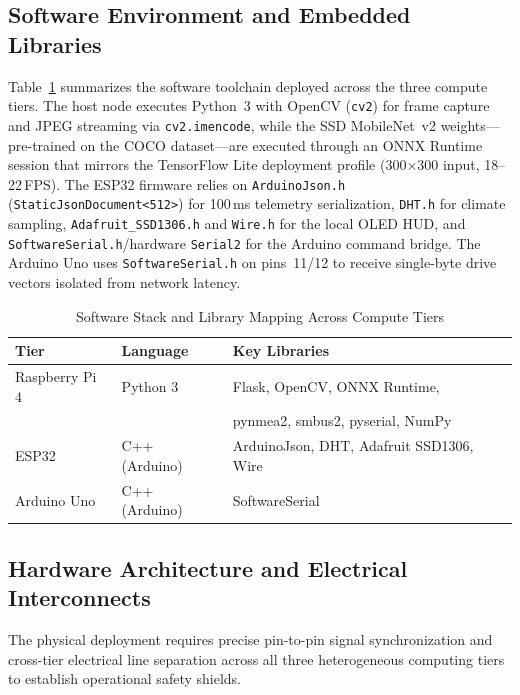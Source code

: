 \documentclass[conference]{IEEEtran}
\begin{document}
\subsection{Software Environment and Embedded Libraries}
Table~\ref{tab:software_stack} summarizes the software toolchain deployed across the three compute tiers. The host node executes Python~3 with OpenCV (\texttt{cv2}) for frame capture and JPEG streaming via \texttt{cv2.imencode}, while the SSD MobileNet~v2 weights---pre-trained on the COCO dataset---are executed through an ONNX Runtime session that mirrors the TensorFlow Lite deployment profile (300$\times$300 input, 18--22\,FPS). The ESP32 firmware relies on \texttt{ArduinoJson.h} (\texttt{StaticJsonDocument<512>}) for 100\,ms telemetry serialization, \texttt{DHT.h} for climate sampling, \texttt{Adafruit\_SSD1306.h} and \texttt{Wire.h} for the local OLED HUD, and \texttt{SoftwareSerial.h}/hardware \texttt{Serial2} for the Arduino command bridge. The Arduino Uno uses \texttt{SoftwareSerial.h} on pins~11/12 to receive single-byte drive vectors isolated from network latency.

\begin{table}[htbp]
\caption{Software Stack and Library Mapping Across Compute Tiers}
\begin{center}
\begin{tabular}{lll}
\toprule
\textbf{Tier} & \textbf{Language} & \textbf{Key Libraries} \\
\midrule
Raspberry Pi 4 & Python 3 & Flask, OpenCV, ONNX Runtime, \\
 &  & pynmea2, smbus2, pyserial, NumPy \\
ESP32 & C++ (Arduino) & ArduinoJson, DHT, Adafruit SSD1306, Wire \\
Arduino Uno & C++ (Arduino) & SoftwareSerial \\
\bottomrule
\end{tabular}
\label{tab:software_stack}
\end{center}
\end{table}

\subsection{Hardware Architecture and Electrical Interconnects}
The physical deployment requires precise pin-to-pin signal synchronization and cross-tier electrical line separation across all three heterogeneous computing tiers to establish operational safety shields.
\end{document}
